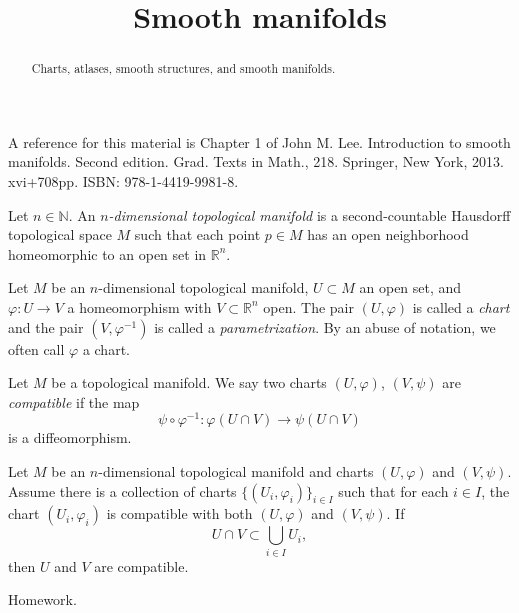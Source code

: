 \documentclass{ximera}
\title{Smooth manifolds}
\begin{document}
    \begin{abstract} Charts, atlases, smooth structures, and smooth manifolds.   \end{abstract}
    \maketitle

    A reference for this material is Chapter 1 of John M. Lee. Introduction to smooth manifolds. Second edition. Grad. Texts in Math., 218. Springer, New York, 2013. xvi+708pp. ISBN: 978-1-4419-9981-8.

    \begin{definition}
        Let $n \in \mathbb{N}$.  An  \emph{$n$-dimensional topological manifold} is a second-countable Hausdorff topological space $M$ such that each point $p \in M$ has an open neighborhood homeomorphic to an open set in $\mathbb{R}^n$.
    \end{definition}
    
    \begin{definition}
        Let $M$ be an $n$-dimensional topological manifold, $U \subset M$ an open set, and $\varphi : U \to V$ a homeomorphism with $V \subset \mathbb{R}^n$ open.  The pair $(U, \varphi)$ is called a \emph{chart} and  the pair $(V ,\varphi ^{-1} )$ is called a \emph{parametrization}.  By an abuse of notation, we often call  $\varphi$ a chart.
    \end{definition}
    
    \begin{definition}
        Let $M$ be a topological manifold. We say two charts $(U , \varphi )$, $(V, \psi)$  are \emph{compatible} if  the map 
        \[    \psi \circ \varphi ^{-1} : \varphi (U \cap V) \to \psi (U \cap V)      \]
        is a diffeomorphism.
    \end{definition}

    \begin{proposition}
        Let $M$ be an $n$-dimensional topological manifold and charts $(U, \varphi )$ and $(V, \psi )$. Assume there is a collection of charts $\{ (U_i, \varphi _i ) \} _{i \in I} $  such that for each $i \in I$, the chart $(U_i, \varphi_i ) $ is compatible with both $(U, \varphi) $ and $(V, \psi)$. If 
    \[    U \cap V \subset \bigcup_{i \in I} U_i ,  \]
    then $U$ and $V$ are compatible. 


    
        \begin{solution}
        Homework.
    \end{solution}
    \end{proposition}
\end{document}
